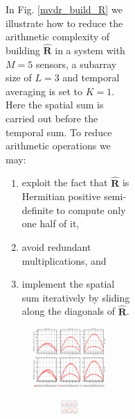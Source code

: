 \documentclass[12pt,journal,draftclsnofoot,onecolumn]{IEEEtran}
\newcommand\mat[1]{\boldsymbol{#1}}
\newcommand\1{\vec 1}
\newcommand*\eR{\mat{\hat R}}
\begin{document}
\begin{figure}[H]
\begin{figure}[!t]
\begin{figure}[!t]
\begin{figure}[t]
In Fig. \ref{mvdr_build_R} we illustrate how to reduce the arithmetic complexity of building $\eR$ in a system with $M=5$ sensors, a subarray size of $L=3$ and temporal averaging is set to $K=1$. Here the spatial sum is carried out before the temporal sum. To reduce arithmetic operations we may:
%
\begin{enumerate}
\item exploit the fact that $\eR$ is Hermitian positive semi-definite to compute only one half of it,
\item avoid redundant multiplications, and
\item implement the spatial sum iteratively by sliding along the diagonals of $\eR$.
\end{enumerate}
%
\ifPeerReview
\begin{figure}[!t]\centering
\includegraphics[width=.8\linewidth]{gfx/buske5.eps}
\else
\begin{figure}[!t]\centering
\includegraphics[width=\linewidth]{gfx/buildR-breakdown.eps}

\end{figure}
\end{figure}
\end{figure}
\end{figure}
\end{figure}
\end{figure}
\end{document}
